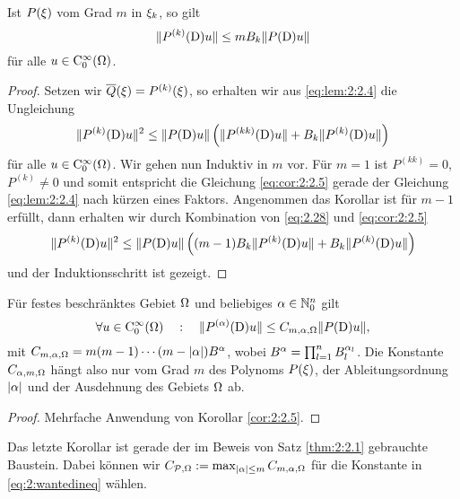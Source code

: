 \begin{cor}\label{cor:2:2.5}
Ist $P(\xi)$ vom Grad $m$ in $\xi_k$, so gilt
\begin{equation}\label{eq:cor:2:2.5}
\lVert P^{(k)}(\mathrm D)u\rVert\leq mB_k\lVert P(\mathrm D)u\rVert
\end{equation}
für alle $u\in\mathrm C_0^\infty(\Omega)$.
\end{cor}
\begin{proof}
Setzen wir $\overline{Q}(\xi)=P^{(k)}(\xi)$, so erhalten wir aus \eqref{eq:lem:2:2.4} die Ungleichung
\begin{equation}\label{eq:2.28}
\lVert P^{(k)}(\mathrm D)u\rVert^2\leq\lVert P(\mathrm D)u\rVert\left(\lVert P^{(kk)}(\mathrm D)u\rVert+B_k\lVert P^{(k)}(\mathrm D)u\rVert\right)
\end{equation}
für alle $u\in\mathrm C_0^\infty(\Omega)$. Wir gehen nun Induktiv in $m$ vor.
Für $m=1$ ist $P^{(kk)}=0$, $P^{(k)}\neq0$ und somit entspricht die Gleichung \eqref{eq:cor:2:2.5}
gerade der Gleichung \eqref{eq:lem:2:2.4} nach kürzen eines Faktors.
Angenommen das Korollar ist für $m-1$ erfüllt,
dann erhalten wir durch Kombination von \eqref{eq:2.28} und \eqref{eq:cor:2:2.5}
\begin{equation}
\lVert P^{(k)}(\mathrm D)u\rVert^2\leq\lVert P(\mathrm D)u\rVert\left((m-1)B_k\lVert P^{(k)}(\mathrm D)u\rVert+B_k\lVert P^{(k)}(\mathrm D)u\rVert\right)
\end{equation}
und der Induktionsschritt  ist gezeigt.
\end{proof}

\begin{cor}\label{cor:2:2.6}
Für festes beschränktes Gebiet $\Omega$ und beliebiges $\alpha\in\mathbb N^n_0$ gilt
\begin{equation}
\forall u\in\mathrm C_0^\infty(\Omega)\quad:\quad \lVert P^{(\alpha)}(\mathrm D)u\rVert\leq C_{m,\alpha,\Omega}\lVert P(\mathrm D)u\rVert,
\end{equation}
mit $C_{m,\alpha,\Omega}=m(m-1)\cdots(m-\lvert\alpha\rvert)B^\alpha$, wobei $B^\alpha=\prod_{l=1}^n B^{\alpha_l}_l$.
Die Konstante $C_{\alpha,m,\Omega}$ hängt also nur vom Grad $m$ des Polynoms $P(\xi)$,
der Ableitungsordnung $\lvert\alpha\rvert$ und der Ausdehnung des Gebiets $\Omega$ ab.
\end{cor}

\begin{proof}
Mehrfache Anwendung von Korollar \ref{cor:2:2.5}.
\end{proof}

Das letzte Korollar ist gerade der im Beweis
von Satz \ref{thm:2:2.1} gebrauchte Baustein.
Dabei können wir $C_{\mathcal P,\Omega}:=\max_{|\alpha|\le m} C_{m,\alpha,\Omega}$
für die Konstante in \eqref{eq:2:wantedineq} wählen.

